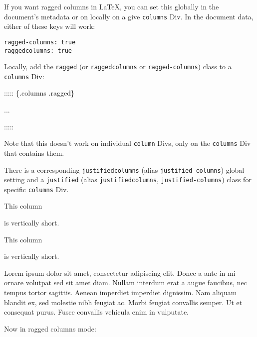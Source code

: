 \documentclass[
]{article}
\newenvironment{Shaded}{}{}
\newcommand{\NormalTok}[1]{#1}
\begin{document}
If you want ragged columns in LaTeX, you can set this globally in the
document's metadata or on locally on a give \texttt{columns} Div. In the
document data, either of these keys will work:

\begin{verbatim}
ragged-columns: true
raggedcolumns: true
\end{verbatim}

Locally, add the \texttt{ragged} (or \texttt{raggedcolumns} or
\texttt{ragged-columns}) class to a \texttt{columns} Div:

\begin{Shaded}
\begin{Highlighting}[]
\NormalTok{::::: \{.columns .ragged\}}

\NormalTok{...}

\NormalTok{:::::}
\end{Highlighting}
\end{Shaded}

Note that this doesn't work on individual \texttt{column} Divs, only on
the \texttt{columns} Div that contains them.

There is a corresponding \texttt{justifiedcolumns} (alias
\texttt{justified-columns}) global setting and a \texttt{justified}
(alias \texttt{justifiedcolumns}, \texttt{justified-columns}) class for
specific \texttt{columns} Div.

{\begin{multicols}{3}

This column

is vertically short.

\columnbreak

This column

is vertically short.

\columnbreak

Lorem ipsum dolor sit amet, consectetur adipiscing elit. Donec a ante in
mi ornare volutpat sed sit amet diam. Nullam interdum erat a augue
faucibus, nec tempus tortor sagittis. Aenean imperdiet imperdiet
dignissim. Nam aliquam blandit ex, sed molestie nibh feugiat ac. Morbi
feugiat convallis semper. Ut et consequat purus. Fusce convallis
vehicula enim in vulputate.

\end{multicols}
}

Now in ragged columns mode:
\end{document}
